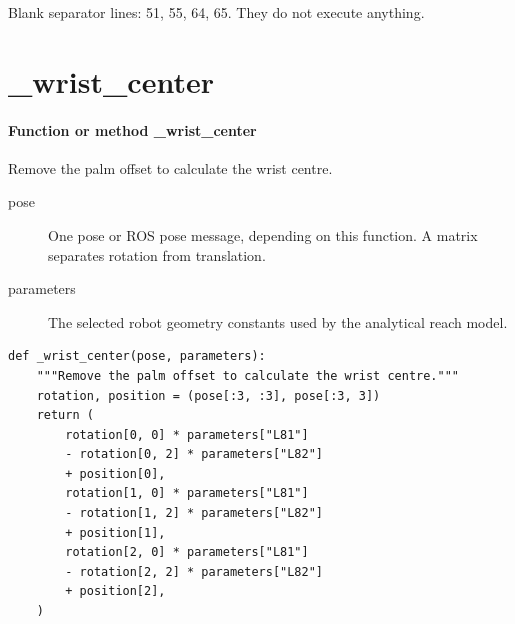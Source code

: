 \documentclass[11pt,a4paper]{book}
\begin{document}
Blank separator lines: 51, 55, 64, 65. They do not execute anything.

\section{\_wrist\_center}

\paragraph{Function or method \_wrist\_center}
Remove the palm offset to calculate the wrist centre.

\begin{description}
\item[pose] One pose or ROS pose message, depending on this function. A matrix separates rotation from translation.
\item[parameters] The selected robot geometry constants used by the analytical reach model.
\end{description}

\begin{lstlisting}[firstnumber=66]
def _wrist_center(pose, parameters):
    """Remove the palm offset to calculate the wrist centre."""
    rotation, position = (pose[:3, :3], pose[:3, 3])
    return (
        rotation[0, 0] * parameters["L81"]
        - rotation[0, 2] * parameters["L82"]
        + position[0],
        rotation[1, 0] * parameters["L81"]
        - rotation[1, 2] * parameters["L82"]
        + position[1],
        rotation[2, 0] * parameters["L81"]
        - rotation[2, 2] * parameters["L82"]
        + position[2],
    )


\end{lstlisting}
\end{document}
